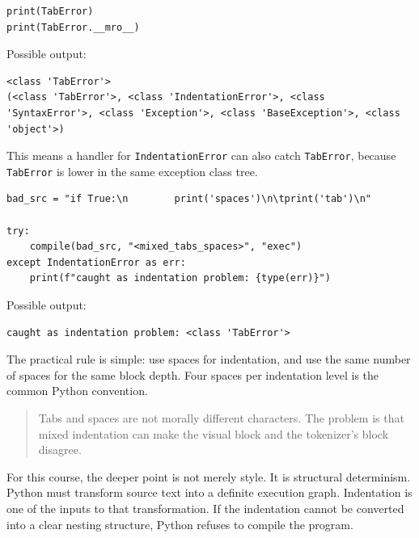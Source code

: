 \begin{verbatim}
print(TabError)
print(TabError.__mro__)
\end{verbatim}

Possible output:

\begin{verbatim}
<class 'TabError'>
(<class 'TabError'>, <class 'IndentationError'>, <class 'SyntaxError'>, <class 'Exception'>, <class 'BaseException'>, <class 'object'>)
\end{verbatim}

This means a handler for \texttt{IndentationError} can also catch \texttt{TabError}, because \texttt{TabError} is lower in the same exception class tree.

\begin{verbatim}
bad_src = "if True:\n        print('spaces')\n\tprint('tab')\n"

try:
    compile(bad_src, "<mixed_tabs_spaces>", "exec")
except IndentationError as err:
    print(f"caught as indentation problem: {type(err)}")
\end{verbatim}

Possible output:

\begin{verbatim}
caught as indentation problem: <class 'TabError'>
\end{verbatim}

The practical rule is simple: use spaces for indentation, and use the same number of spaces for the same block depth. Four spaces per indentation level is the common Python convention.

\begin{quote}
Tabs and spaces are not morally different characters. The problem is that mixed indentation can make the visual block and the tokenizer's block disagree.
\end{quote}

For this course, the deeper point is not merely style. It is structural determinism. Python must transform source text into a definite execution graph. Indentation is one of the inputs to that transformation. If the indentation cannot be converted into a clear nesting structure, Python refuses to compile the program.